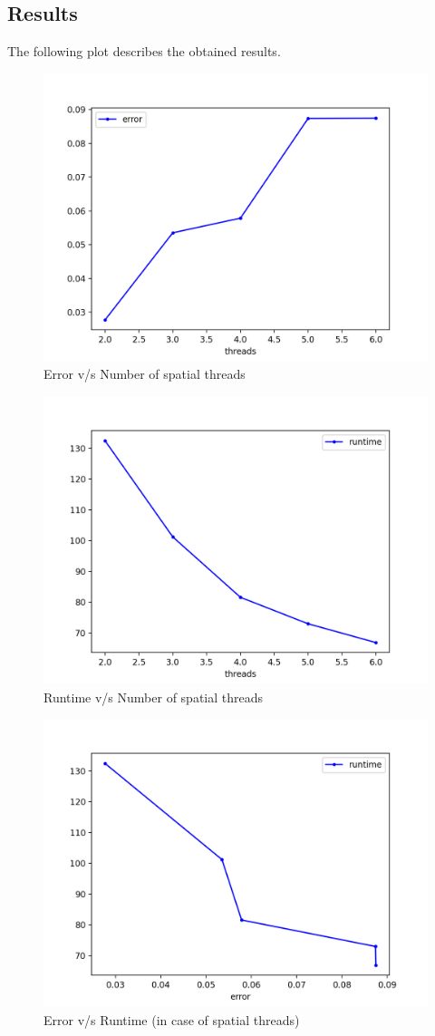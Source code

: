 \documentclass[a4paper]{article}
\begin{document}
\subsection*{Results}
The following plot describes the obtained results.
\begin{figure}[H]
    \centering
    \includegraphics[width=0.5\linewidth]{pthreads-spatial-dynamic-error.png}
    \caption{Error v/s Number of spatial threads}
    \label{fig:pthreads-spatial-dynamic-error.png}
\end{figure}
\begin{figure}[H]
    \centering
    \includegraphics[width=0.5\linewidth]{spatial-pthreads-dynamic-runtime.png}
    \caption{Runtime v/s Number of spatial threads}
    \label{fig:spatial-pthreads-dynamic-runtime.png}
\end{figure}
\begin{figure}[H]
    \centering
    \includegraphics[width=0.5\linewidth]{pthread-spatial-dynamic.png}
    \caption{Error v/s Runtime (in case of spatial threads)}
    \label{fig:pthread-spatial-dynamic.png}
\end{figure}
\end{document}
